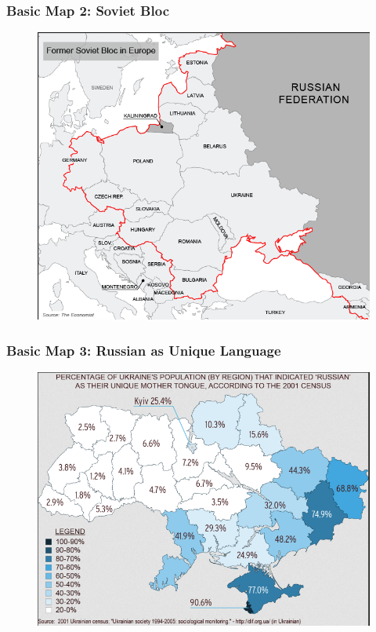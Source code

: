 \documentclass{beamer}
\begin{document}
\begin{frame} 
	\frametitle{\LARGE{Basic Map 2: Soviet Bloc}}
	\begin{figure}[ht!]
		\centering
		\includegraphics[width=\textwidth,height=0.9\textheight,keepaspectratio]{map2.png}
	\end{figure}
\end{frame}

\begin{frame} 
	\frametitle{\LARGE{Basic Map 3: Russian as Unique Language}}
	\begin{figure}[ht!]
		\centering
		\includegraphics[width=\textwidth,height=0.9\textheight,keepaspectratio]{map3.png}
	\end{figure}
\end{frame}
\end{document}
